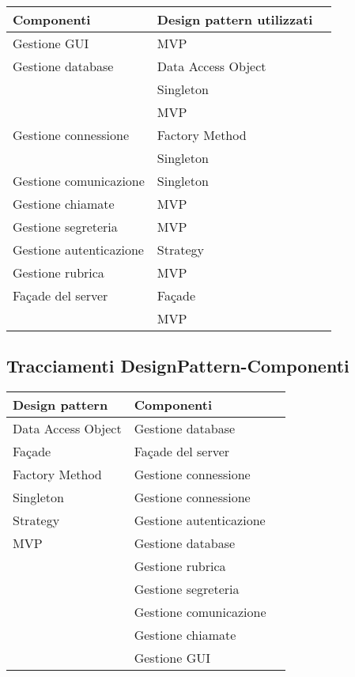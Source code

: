 \begin{center}
\begin{longtable}{lp{}l}
\toprule Componenti & Design pattern utilizzati\\
\midrule
Gestione GUI & MVP \\
Gestione database & Data Access Object \\
& Singleton \\
& MVP \\
Gestione connessione & Factory Method \\
 & Singleton \\
Gestione comunicazione & Singleton \\
Gestione chiamate & MVP \\
Gestione segreteria & MVP \\
Gestione autenticazione & Strategy \\
Gestione rubrica & MVP \\
Façade del server & Façade \\
& MVP \\
\bottomrule
\end{longtable}
\end{center}
\subsection{Tracciamenti DesignPattern-Componenti}\label{sec:tracDpComp}

\begin{center}
\begin{longtable}{lp{}l}
\toprule Design pattern & Componenti\\
\midrule
Data Access Object & Gestione database\\
Façade & Façade del server\\
Factory Method & Gestione connessione\\
Singleton & Gestione connessione\\
Strategy & Gestione autenticazione\\
MVP & Gestione database\\
& Gestione rubrica\\
& Gestione segreteria\\
& Gestione comunicazione\\
& Gestione chiamate\\
& Gestione GUI\\
\bottomrule
\end{longtable}
\end{center}
